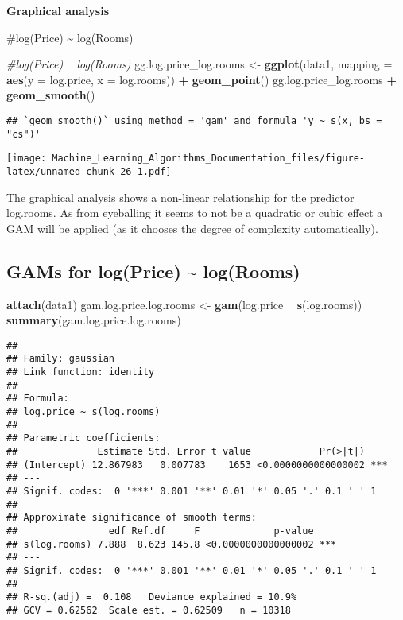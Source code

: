 \documentclass[
]{article}
\newenvironment{Shaded}{\begin{snugshade}}{\end{snugshade}}
\newcommand{\CommentTok}[1]{\textcolor[rgb]{0.56,0.35,0.01}{\textit{#1}}}
\newcommand{\DataTypeTok}[1]{\textcolor[rgb]{0.13,0.29,0.53}{#1}}
\newcommand{\KeywordTok}[1]{\textcolor[rgb]{0.13,0.29,0.53}{\textbf{#1}}}
\newcommand{\NormalTok}[1]{#1}
\newcommand{\OperatorTok}[1]{\textcolor[rgb]{0.81,0.36,0.00}{\textbf{#1}}}
\newcommand{\StringTok}[1]{\textcolor[rgb]{0.31,0.60,0.02}{#1}}
\begin{document}
\textbf{Graphical analysis}

\#log(Price) \textasciitilde{} log(Rooms)

\begin{Shaded}
\begin{Highlighting}[]
\CommentTok{#log(Price) ~ log(Rooms)}
\NormalTok{gg.log.price_log.rooms <-}\StringTok{ }\KeywordTok{ggplot}\NormalTok{(data1, }\DataTypeTok{mapping =} \KeywordTok{aes}\NormalTok{(}\DataTypeTok{y =}\NormalTok{ log.price, }\DataTypeTok{x =}\NormalTok{ log.rooms)) }\OperatorTok{+}\StringTok{ }\KeywordTok{geom_point}\NormalTok{()}
\NormalTok{gg.log.price_log.rooms }\OperatorTok{+}\StringTok{ }\KeywordTok{geom_smooth}\NormalTok{()}
\end{Highlighting}
\end{Shaded}

\begin{verbatim}
## `geom_smooth()` using method = 'gam' and formula 'y ~ s(x, bs = "cs")'
\end{verbatim}

\texttt{[image: Machine\_Learning\_Algorithms\_Documentation\_files/figure-latex/unnamed-chunk-26-1.pdf]}

The graphical analysis shows a non-linear relationship for the predictor
log.rooms. As from eyeballing it seems to not be a quadratic or cubic
effect a GAM will be applied (as it chooses the degree of complexity
automatically).

\hypertarget{gams-for-logprice-logrooms}{%
\subsection{GAMs for log(Price) \textasciitilde{}
log(Rooms)}\label{gams-for-logprice-logrooms}}

\begin{Shaded}
\begin{Highlighting}[]
\KeywordTok{attach}\NormalTok{(data1)}
\NormalTok{gam.log.price.log.rooms <-}\StringTok{ }\KeywordTok{gam}\NormalTok{(log.price }\OperatorTok{~}\StringTok{ }\KeywordTok{s}\NormalTok{(log.rooms))}
\KeywordTok{summary}\NormalTok{(gam.log.price.log.rooms)}
\end{Highlighting}
\end{Shaded}

\begin{verbatim}
## 
## Family: gaussian 
## Link function: identity 
## 
## Formula:
## log.price ~ s(log.rooms)
## 
## Parametric coefficients:
##              Estimate Std. Error t value            Pr(>|t|)    
## (Intercept) 12.867983   0.007783    1653 <0.0000000000000002 ***
## ---
## Signif. codes:  0 '***' 0.001 '**' 0.01 '*' 0.05 '.' 0.1 ' ' 1
## 
## Approximate significance of smooth terms:
##                edf Ref.df     F             p-value    
## s(log.rooms) 7.888  8.623 145.8 <0.0000000000000002 ***
## ---
## Signif. codes:  0 '***' 0.001 '**' 0.01 '*' 0.05 '.' 0.1 ' ' 1
## 
## R-sq.(adj) =  0.108   Deviance explained = 10.9%
## GCV = 0.62562  Scale est. = 0.62509   n = 10318
\end{verbatim}
\end{document}

